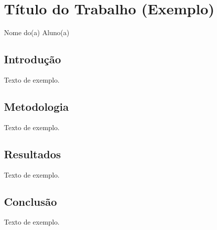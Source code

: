 %
%

\chapter{Título do Trabalho (Exemplo)}

\begin{center}
Nome do(a) Aluno(a)
\end{center}

\begin{abstract}
Resumo do trabalho (exemplo).
\end{abstract}

\section{Introdução}
Texto de exemplo.

\section{Metodologia}
Texto de exemplo.

\section{Resultados}
Texto de exemplo.

\section{Conclusão}
Texto de exemplo.


